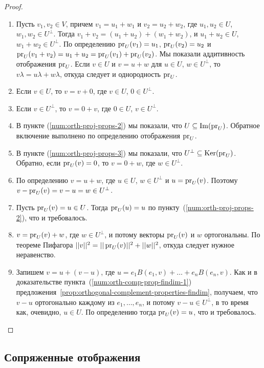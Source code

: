 \begin{proof}
\begin{enumerate}
\item Пусть $v_1,v_2\in V$, причем $v_1 = u_1 + w_1$
и $v_2 = u_2 + w_2$, где $u_1,u_2\in U$, $w_1,w_2\in U^\perp$.
Тогда $v_1+v_2 = (u_1+u_2) + (w_1+w_2)$, и $u_1+u_2\in U$,
$w_1+w_2\in U^\perp$. По определению
$\operatorname{pr}_U(v_1) = u_1$, $\operatorname{pr}_U(v_2) = u_2$ и
$\operatorname{pr}_U(v_1+v_2) = u_1 + u_2 = \operatorname{pr}_U(v_1) + \operatorname{pr}_U(v_2)$.
Мы показали аддитивность отображения $\operatorname{pr}_U$. Если $v\in U$
и $v = u + w$ для $u\in U$, $w\in U^\perp$, то
$v\lambda = u\lambda + w\lambda$, откуда следует и однородность
$\operatorname{pr}_U$.
\item Если $v\in U$, то $v = v + 0$, где $v\in U$, $0\in U^\perp$.
\item Если $v\in U^\perp$, то $v = 0 + v$, где $0\in U$, $v\in U^\perp$.
\item В пункте (\ref{num:orth-proj-props-2}) мы показали,
что $U\subseteq\operatorname{Im}(\operatorname{pr}_U)$. Обратное включение выполнено
по определению отображения $\operatorname{pr}_U$.
\item В пункте (\ref{num:orth-proj-props-3}) мы показали,
что $U^\perp\subseteq\operatorname{Ker}(\operatorname{pr}_U)$. Обратно, если
$\operatorname{pr}_U(v) = 0$, то $v = 0 + w$, где $w\in U^\perp$.
\item По определению $v = u + w$, где $u\in U$, $w\in U^\perp$
и $u = \operatorname{pr}_U(v)$. Поэтому $v - \operatorname{pr}_U(v) = v - u = w\in U^\perp$.
\item Пусть $\operatorname{pr}_U(v) = u\in U$. Тогда $\operatorname{pr}_U(u) = u$
по пункту~(\ref{num:orth-proj-props-2}), что и требовалось.
\item $v = \operatorname{pr}_U(v) + w$, где $w\in U^\perp$, и потому векторы
$\operatorname{pr}_U(v)$ и $w$ ортогональны. По теореме Пифагора
$||v||^2 = ||\operatorname{pr}_U(v)||^2 + ||w||^2$, откуда следует нужное неравенство.
\item Запишем $v = u + (v-u)$,
где $u = e_1B(e_1,v) + \dots + e_n B(e_n,v)$. Как и в доказательстве
пункта~(\ref{num:orth-comp-prop-findim-1})
предложения~\ref{prop:orthogonal-complement-properties-findim},
получаем, что $v-u$ ортогонально каждому из $e_1,\dots,e_n$,
и потому $v-u\in U^\perp$, в то время как, очевидно,
$u\in U$. По определению тогда $\operatorname{pr}_U(v) = u$, что и требовалось.
\end{enumerate}
\end{proof}

\subsection{Сопряженные отображения}

